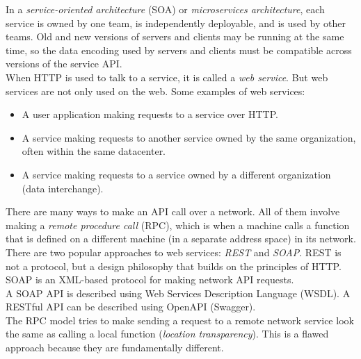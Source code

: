 \documentclass[12pt, titlepage]{article}
\begin{document}
In a \textit{service-oriented architecture} (SOA) or \textit{microservices architecture}, each service is owned by one team, is independently deployable, and is used by other teams. Old and new versions of servers and clients may be running at the same time, so the data encoding used by servers and clients must be compatible across versions of the service API. \\

When HTTP is used to talk to a service, it is called a \textit{web service}. But web services are not only used on the web. Some examples of web services:

\begin{itemize}
    \item A user application making requests to a service over HTTP.
    \item A service making requests to another service owned by the same organization, often within the same datacenter.
    \item A service making requests to a service owned by a different organization (data interchange).
\end{itemize}

There are many ways to make an API call over a network. All of them involve making a \textit{remote procedure call} (RPC), which is when a machine calls a function that is defined on a different machine (in a separate address space) in its network. \\

There are two popular approaches to web services: \textit{REST} and \textit{SOAP}. REST is not a protocol, but a design philosophy that builds on the principles of HTTP. SOAP is an XML-based protocol for making network API requests. \\

A SOAP API is described using Web Services Description Language (WSDL). A RESTful API can be described using OpenAPI (Swagger). \\

The RPC model tries to make sending a request to a remote network service look the same as calling a local function (\textit{location transparency}). This is a flawed approach because they are fundamentally different. \\
\end{document}
